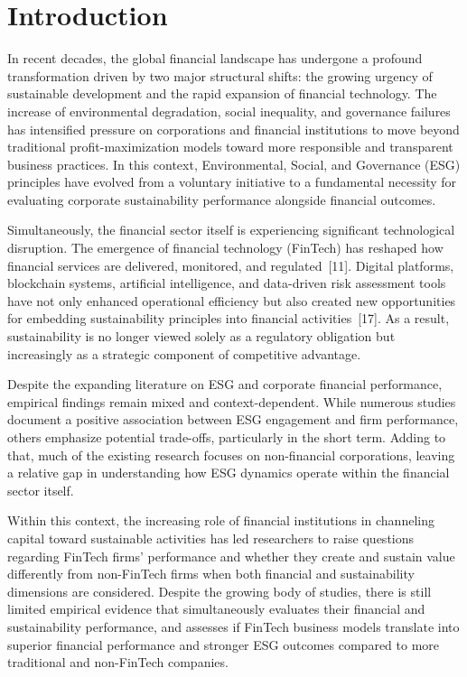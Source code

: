 \documentclass[12pt]{article}
\begin{document}
\newpage

\section{Introduction}\label{sec:intro}
In recent decades, the global financial landscape has undergone a profound transformation driven by two major structural shifts: the growing urgency of sustainable development and the rapid expansion of financial technology. The increase of environmental degradation, social inequality, and governance failures has intensified pressure on corporations and financial institutions to move beyond traditional profit-maximization models toward more responsible and transparent business practices. In this context, Environmental, Social, and Governance (ESG) principles have evolved from a voluntary initiative to a fundamental necessity for evaluating corporate sustainability performance alongside financial outcomes.

Simultaneously, the financial sector itself is experiencing significant technological disruption. The emergence of financial technology (FinTech) has reshaped how financial services are delivered, monitored, and regulated~[11]. Digital platforms, blockchain systems, artificial intelligence, and data-driven risk assessment tools have not only enhanced operational efficiency but also created new opportunities for embedding sustainability principles into financial activities~[17]. As a result, sustainability is no longer viewed solely as a regulatory obligation but increasingly as a strategic component of competitive advantage.

Despite the expanding literature on ESG and corporate financial performance, empirical findings remain mixed and context-dependent. While numerous studies document a positive association between ESG engagement and firm performance, others emphasize potential trade-offs, particularly in the short term. Adding to that, much of the existing research focuses on non-financial corporations, leaving a relative gap in understanding how ESG dynamics operate within the financial sector itself.

Within this context, the increasing role of financial institutions in channeling capital toward sustainable activities has led researchers to raise questions regarding FinTech firms' performance and whether they create and sustain value differently from non-FinTech firms when both financial and sustainability dimensions are considered. Despite the growing body of studies, there is still limited empirical evidence that simultaneously evaluates their financial and sustainability performance, and assesses if FinTech business models translate into superior financial performance and stronger ESG outcomes compared to more traditional and non-FinTech companies.
\end{document}
